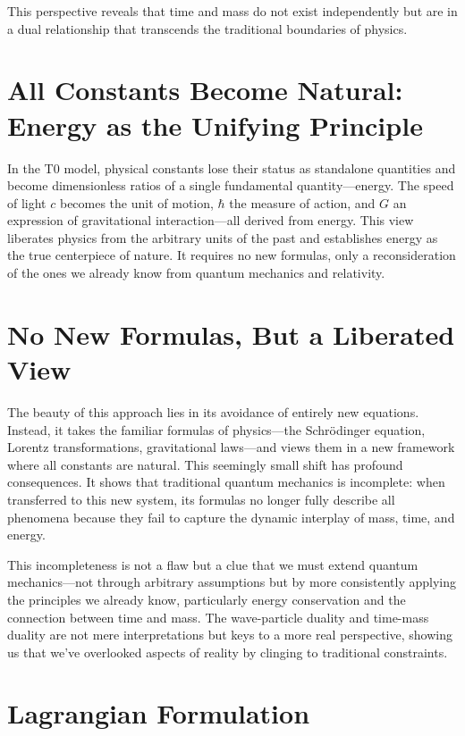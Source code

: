 \documentclass[a4paper,12pt]{article}
\begin{document}
	This perspective reveals that time and mass do not exist independently but are in a dual relationship that transcends the traditional boundaries of physics.
	
	\section{All Constants Become Natural: Energy as the Unifying Principle}
	
	In the T0 model, physical constants lose their status as standalone quantities and become dimensionless ratios of a single fundamental quantity—energy. The speed of light \(c\) becomes the unit of motion, \(\hbar\) the measure of action, and \(G\) an expression of gravitational interaction—all derived from energy. This view liberates physics from the arbitrary units of the past and establishes energy as the true centerpiece of nature. It requires no new formulas, only a reconsideration of the ones we already know from quantum mechanics and relativity.
	
	\section{No New Formulas, But a Liberated View}
	
	The beauty of this approach lies in its avoidance of entirely new equations. Instead, it takes the familiar formulas of physics—the Schrödinger equation, Lorentz transformations, gravitational laws—and views them in a new framework where all constants are natural. This seemingly small shift has profound consequences. It shows that traditional quantum mechanics is incomplete: when transferred to this new system, its formulas no longer fully describe all phenomena because they fail to capture the dynamic interplay of mass, time, and energy.
	
	This incompleteness is not a flaw but a clue that we must extend quantum mechanics—not through arbitrary assumptions but by more consistently applying the principles we already know, particularly energy conservation and the connection between time and mass. The wave-particle duality and time-mass duality are not mere interpretations but keys to a more real perspective, showing us that we've overlooked aspects of reality by clinging to traditional constraints.
	
	\section{Lagrangian Formulation}
	
\end{document}
